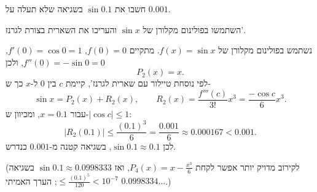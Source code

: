 
\begin{question}
חשבו את $\sin 0.1$ בשגיאה שלא תעלה על $0.001$.
\end{question}

\begin{hint}
השתמשו בפולינום מקלורן של $\sin x$ והעריכו את השארית בצורת לגרנז'.
\end{hint}

\begin{solution}
נשתמש בפולינום מקלורן של $f(x)=\sin x$. מתקיים $f(0)=0$, $f'(0)=\cos 0=1$, $f''(0)=-\sin 0=0$, ולכן
\[ P_2(x)=x. \]
לפי נוסחת טיילור עם שארית לגרנז', קיימת $c$ בין $0$ ל-$x$ כך ש-
\[ \sin x=P_2(x)+R_2(x),\qquad R_2(x)=\frac{f'''(c)}{3!}x^3=\frac{-\cos c}{6}x^3. \]
עבור $x=0.1$, ומכיוון ש-$|\cos c|\le 1$:
\[ |R_2(0.1)|\le\frac{(0.1)^3}{6}=\frac{0.001}{6}\approx 0.000167<0.001. \]
לכן $\sin 0.1\approx 0.1$, בשגיאה קטנה מ-$0.001$ כנדרש.

(לקירוב מדויק יותר אפשר לקחת $P_4(x)=x-\frac{x^3}{6}$, ואז $\sin 0.1\approx 0.0998333$ בשגיאה $\le\frac{(0.1)^5}{120}<10^{-7}$; הערך האמיתי $0.0998334\ldots$.)
\end{solution}
